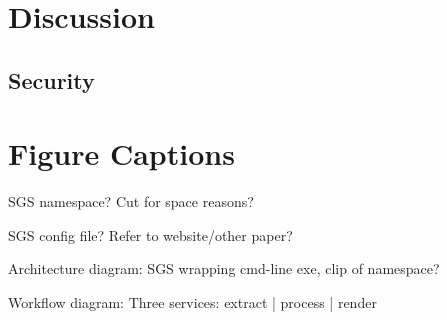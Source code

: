 \documentclass[a4paper]{article}
\begin{document}
\section{Discussion}

\subsection{Security}




\newpage
\singlespace

\section*{Figure Captions}

SGS namespace?  Cut for space reasons?

SGS config file?  Refer to website/other paper?

Architecture diagram: SGS wrapping cmd-line exe, clip of namespace?

Workflow diagram: Three services: extract | process | render

\newpage
\end{document}
